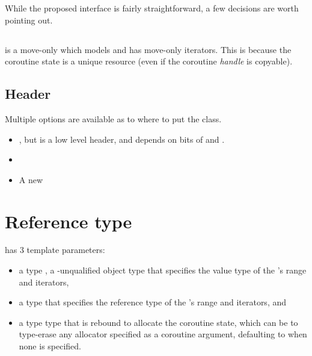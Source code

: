 \documentclass{wg21}
\begin{document}
While the proposed  interface is fairly straightforward, a few decisions are worth pointing out.

\subsection{}

 is a move-only  which models  and has move-only iterators.
This is because the coroutine state is a unique resource (even if the coroutine \textit{handle} is copyable).


\subsection{Header}

Multiple options are available as to where to put the  class.

\begin{itemize}
    \item {}, but  is a low level header,
      and  depends on bits of  and .

    \item {}

    \item A new 

\end{itemize}

\section{Reference type}

 has 3 template parameters:


\begin{itemize}
\item a type ,
  a \cv-unqualified object type that specifies the value type
  of the 's range and iterators,
\item a type  that specifies the reference type
  of the 's range and iterators, and
\item a type  type that is rebound to allocate the coroutine state,
  which can be  to type-erase
  any allocator specified as a coroutine argument,
  defaulting to  when none is specified.
\end{itemize}
\end{document}
